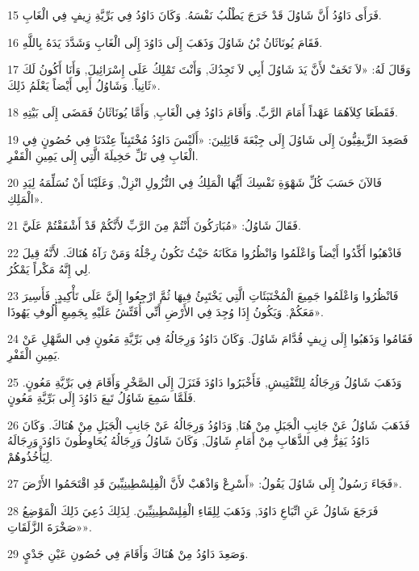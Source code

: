 \par 15 فَرَأَى دَاوُدُ أَنَّ شَاوُلَ قَدْ خَرَجَ يَطْلُبُ نَفْسَهُ. وَكَانَ دَاوُدُ فِي بَرِّيَّةِ زِيفٍ فِي الْغَابِ.
\par 16 فَقَامَ يُونَاثَانُ بْنُ شَاوُلَ وَذَهَبَ إِلَى دَاوُدَ إِلَى الْغَابِ وَشَدَّدَ يَدَهُ بِاللَّهِ.
\par 17 وَقَالَ لَهُ: «لاَ تَخَفْ لأَنَّ يَدَ شَاوُلَ أَبِي لاَ تَجِدُكَ, وَأَنْتَ تَمْلِكُ عَلَى إِسْرَائِيلَ, وَأَنَا أَكُونُ لَكَ ثَانِياً. وَشَاوُلُ أَبِي أَيْضاً يَعْلَمُ ذَلِكَ».
\par 18 فَقَطَعَا كِلاَهُمَا عَهْداً أَمَامَ الرَّبِّ. وَأَقَامَ دَاوُدُ فِي الْغَابِ, وَأَمَّا يُونَاثَانُ فَمَضَى إِلَى بَيْتِهِ.
\par 19 فَصَعِدَ الزِّيفِيُّونَ إِلَى شَاوُلَ إِلَى جِبْعَةَ قَائِلِينَ: «أَلَيْسَ دَاوُدُ مُخْتَبِئاً عِنْدَنَا فِي حُصُونٍ فِي الْغَابِ فِي تَلِّ حَخِيلَةَ الَّتِي إِلَى يَمِينِ الْقَفْرِ.
\par 20 فَالآنَ حَسَبَ كُلِّ شَهْوَةِ نَفْسِكَ أَيُّهَا الْمَلِكُ فِي النُّزُولِ انْزِلْ, وَعَلَيْنَا أَنْ نُسَلِّمَهُ لِيَدِ الْمَلِكِ».
\par 21 فَقَالَ شَاوُلُ: «مُبَارَكُونَ أَنْتُمْ مِنَ الرَّبِّ لأَنَّكُمْ قَدْ أَشْفَقْتُمْ عَلَيَّ.
\par 22 فَاذْهَبُوا أَكِّدُوا أَيْضاً وَاعْلَمُوا وَانْظُرُوا مَكَانَهُ حَيْثُ تَكُونُ رِجْلُهُ وَمَنْ رَآهُ هُنَاكَ. لأَنَّهُ قِيلَ لِي إِنَّهُ مَكْراً يَمْكُرُ.
\par 23 فَانْظُرُوا وَاعْلَمُوا جَمِيعَ الْمُخْتَبَئَاتِ الَّتِي يَخْتَبِئُ فِيهَا ثُمَّ ارْجِعُوا إِلَيَّ عَلَى تَأْكِيدٍ, فَأَسِيرَ مَعَكُمْ. وَيَكُونُ إِذَا وُجِدَ فِي الأَرْضِ أَنِّي أُفَتِّشُ عَلَيْهِ بِجَمِيعِ أُلُوفِ يَهُوذَا».
\par 24 فَقَامُوا وَذَهَبُوا إِلَى زِيفٍ قُدَّامَ شَاوُلَ. وَكَانَ دَاوُدُ وَرِجَالُهُ فِي بَرِّيَّةِ مَعُونٍ فِي السَّهْلِ عَنْ يَمِينِ الْقَفْرِ.
\par 25 وَذَهَبَ شَاوُلُ وَرِجَالُهُ لِلتَّفْتِيشِ, فَأَخْبَرُوا دَاوُدَ فَنَزَلَ إِلَى الصَّخْرِ وَأَقَامَ فِي بَرِّيَّةِ مَعُونٍ. فَلَمَّا سَمِعَ شَاوُلُ تَبِعَ دَاوُدَ إِلَى بَرِّيَّةِ مَعُونٍ.
\par 26 فَذَهَبَ شَاوُلُ عَنْ جَانِبِ الْجَبَلِ مِنْ هُنَا, وَدَاوُدُ وَرِجَالُهُ عَنْ جَانِبِ الْجَبَلِ مِنْ هُنَاكَ. وَكَانَ دَاوُدُ يَفِرُّ فِي الذَّهَابِ مِنْ أَمَامِ شَاوُلَ, وَكَانَ شَاوُلُ وَرِجَالُهُ يُحَاوِطُونَ دَاوُدَ وَرِجَالَهُ لِيَأْخُذُوهُمْ.
\par 27 فَجَاءَ رَسُولٌ إِلَى شَاوُلَ يَقُولُ: «أَسْرِعْ وَاذْهَبْ لأَنَّ الْفِلِسْطِينِيِّينَ قَدِ اقْتَحَمُوا الأَرْضَ».
\par 28 فَرَجَعَ شَاوُلُ عَنِ اتِّبَاعِ دَاوُدَ, وَذَهَبَ لِلِقَاءِ الْفِلِسْطِينِيِّينَ. لِذَلِكَ دُعِيَ ذَلِكَ الْمَوْضِعُ «صَخْرَةَ الزَّلَقَاتِ».
\par 29 وَصَعِدَ دَاوُدُ مِنْ هُنَاكَ وَأَقَامَ فِي حُصُونِ عَيْنِ جَدْيٍ.


